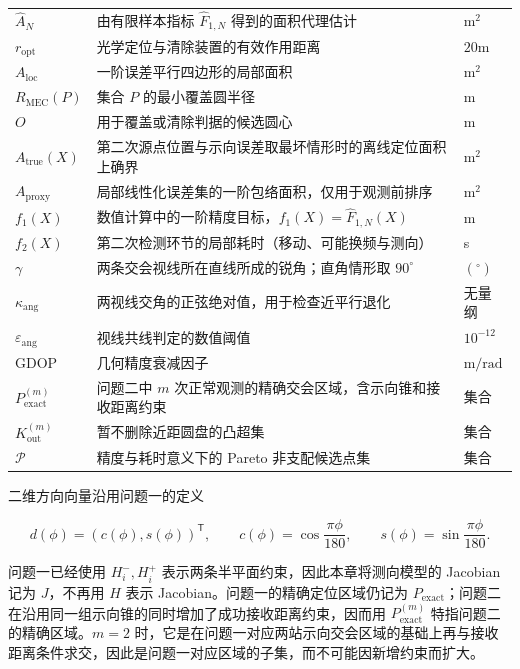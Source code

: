 \begin{longtable}{@{}p{}p{}p{}@{}}
$\widehat A_N$ & 由有限样本指标 $\widehat F_{1,N}$ 得到的面积代理估计 & $\mathrm{m^2}$ \\
$r_{\mathrm{opt}}$ & 光学定位与清除装置的有效作用距离 & $20\mathrm{m}$ \\
$A_{\mathrm{loc}}$ & 一阶误差平行四边形的局部面积 & $\mathrm{m^2}$ \\
$R_{\mathrm{MEC}}(P)$ & 集合 $P$ 的最小覆盖圆半径 & m \\
$O$ & 用于覆盖或清除判据的候选圆心 & m \\
$A_{\mathrm{true}}(X)$ & 第二次源点位置与示向误差取最坏情形时的离线定位面积上确界 & $\mathrm{m^2}$ \\
$A_{\mathrm{proxy}}$ & 局部线性化误差集的一阶包络面积，仅用于观测前排序 & $\mathrm{m^2}$ \\
$f_1(X)$ & 数值计算中的一阶精度目标，$f_1(X)=\widehat F_{1,N}(X)$ & m \\
$f_2(X)$ & 第二次检测环节的局部耗时（移动、可能换频与测向） & s \\
$\gamma$ & 两条交会视线所在直线所成的锐角；直角情形取 $90^\circ$ & $(^\circ)$ \\
$\kappa_{\mathrm{ang}}$ & 两视线交角的正弦绝对值，用于检查近平行退化 & 无量纲 \\
$\varepsilon_{\mathrm{ang}}$ & 视线共线判定的数值阈值 & $10^{-12}$ \\
$\mathrm{GDOP}$ & 几何精度衰减因子 & $\mathrm{m/rad}$ \\
$P_{\mathrm{exact}}^{(m)}$ & 问题二中 $m$ 次正常观测的精确交会区域，含示向锥和接收距离约束 & 集合 \\
$K_{\mathrm{out}}^{(m)}$ & 暂不删除近距圆盘的凸超集 & 集合 \\
$\mathcal P$ & 精度与耗时意义下的 Pareto 非支配候选点集 & 集合 \\
\bottomrule
\end{longtable}

二维方向向量沿用问题一的定义

\[
d(\phi)=\left(c(\phi),s(\phi)\right)^{\mathsf T},\qquad c(\phi)=\cos\frac{\pi\phi}{180},\qquad s(\phi)=\sin\frac{\pi\phi}{180}.
\]

问题一已经使用 $H_i^-,H_i^+$ 表示两条半平面约束，因此本章将测向模型的 Jacobian 记为 $J$，不再用 $H$ 表示 Jacobian。问题一的精确定位区域仍记为 $P_{\mathrm{exact}}$；问题二在沿用同一组示向锥的同时增加了成功接收距离约束，因而用 $P_{\mathrm{exact}}^{(m)}$ 特指问题二的精确区域。$m=2$ 时，它是在问题一对应两站示向交会区域的基础上再与接收距离条件求交，因此是问题一对应区域的子集，而不可能因新增约束而扩大。

